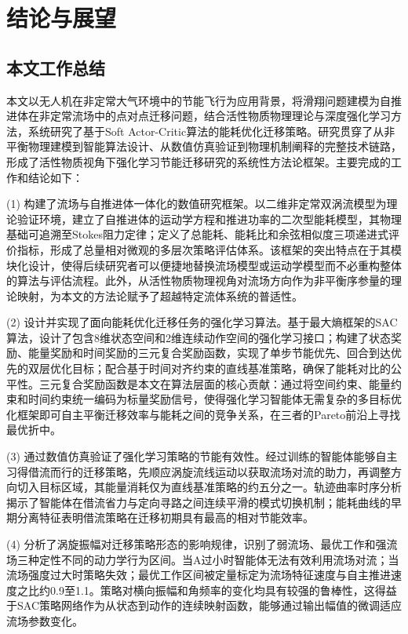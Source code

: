 
\chapter{结论与展望}

\section{本文工作总结}

本文以无人机在非定常大气环境中的节能飞行为应用背景，将滑翔问题建模为自推进体在非定常流场中的点对点迁移问题，结合活性物质物理理论与深度强化学习方法，系统研究了基于Soft Actor-Critic算法的能耗优化迁移策略。研究贯穿了从非平衡物理建模到智能算法设计、从数值仿真验证到物理机制阐释的完整技术链路，形成了活性物质视角下强化学习节能迁移研究的系统性方法论框架。主要完成的工作和结论如下：

(1) 构建了流场与自推进体一体化的数值研究框架。以二维非定常双涡流模型为理论验证环境，建立了自推进体的运动学方程和推进功率的二次型能耗模型，其物理基础可追溯至Stokes阻力定律；定义了总能耗、能耗比和余弦相似度三项递进式评价指标，形成了总量相对微观的多层次策略评估体系。该框架的突出特点在于其模块化设计，使得后续研究者可以便捷地替换流场模型或运动学模型而不必重构整体的算法与评估流程。此外，从活性物质物理视角对流场方向作为非平衡序参量的理论映射，为本文的方法论赋予了超越特定流体系统的普适性。


(2) 设计并实现了面向能耗优化迁移任务的强化学习算法。基于最大熵框架的SAC算法，设计了包含8维状态空间和2维连续动作空间的强化学习接口；构建了状态奖励、能量奖励和时间奖励的三元复合奖励函数，实现了单步节能优先、回合到达优先的双层优化目标；配合基于时间对齐约束的直线基准策略，确保了能耗对比的公平性。三元复合奖励函数是本文在算法层面的核心贡献：通过将空间约束、能量约束和时间约束统一编码为标量奖励信号，使得强化学习智能体无需复杂的多目标优化框架即可自主平衡迁移效率与能耗之间的竞争关系，在三者的Pareto前沿上寻找最优折中。



(3) 通过数值仿真验证了强化学习策略的节能有效性。经过训练的智能体能够自主习得借流而行的迁移策略，先顺应涡旋流线运动以获取流场对流的助力，再调整方向切入目标区域，其能量消耗仅为直线基准策略的约五分之一。轨迹曲率时序分析揭示了智能体在借流省力与定向寻路之间连续平滑的模式切换机制；能耗曲线的早期分离特征表明借流策略在迁移初期具有最高的相对节能效率。



(4) 分析了涡旋振幅对迁移策略形态的影响规律，识别了弱流场、最优工作和强流场三种定性不同的动力学行为区间。当A过小时智能体无法有效利用流场对流；当流场强度过大时策略失效；最优工作区间被定量标定为流场特征速度与自主推进速度之比约0.9至1.1。策略对横向振幅和角频率的变化均具有较强的鲁棒性，这得益于SAC策略网络作为从状态到动作的连续映射函数，能够通过输出幅值的微调适应流场参数变化。



